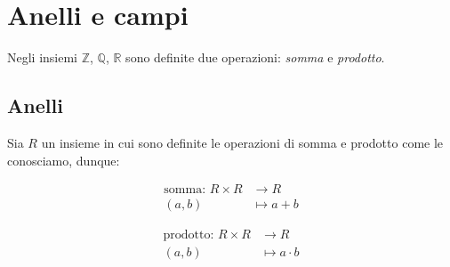 \documentclass[12pt]{report}
\newcommand{\Z}{\mathbb{Z}}
\newcommand{\Q}{\mathbb{Q}}
\newcommand{\R}{\mathbb{R}}
\begin{document}
	
	
	
	\setlength{\parindent}{0pt}
	\setlength{\parskip}{1ex}
	
	\chapter{Anelli e campi}
	Negli insiemi $\Z$, $\Q$, $\R$ sono definite due operazioni: \textit{somma} e \textit{prodotto}.
	
	\section{Anelli}
	Sia $R$ un insieme in cui sono definite le operazioni di somma e prodotto come le conosciamo, dunque:
	
	\[
		\begin{aligned}
			\text{somma: } R \times R &\to R \\
			(a, b) &\mapsto a + b
		\end{aligned}
	\]
	
	\[
		\begin{aligned}
			\text{prodotto: } R \times R &\to R \\
			(a, b) &\mapsto a \cdot b
		\end{aligned}
	\]
	
\end{document}
